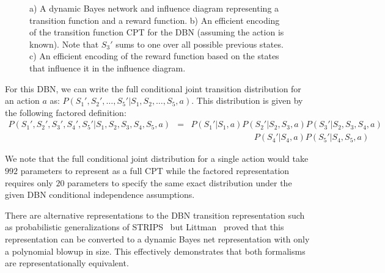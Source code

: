 \begin{figure}[t!]

\begin{center}
\end{center}
\caption{a) A dynamic Bayes network and influence diagram representing
a transition function and a reward function. b) An efficient encoding of
the transition function CPT for the DBN (assuming the action is known). Note that $S_3'$
sums to one over all possible previous states.  c) An efficient encoding
of the reward function based on the states that influence it in the influence
diagram.}
\label{dbnadd}

\end{figure}

For this DBN, we can write the full conditional joint transition distribution for an action $a$ as:
\mbox{$P(S_1',S_2',\ldots,S_5' | S_1,S_2,\ldots,S_5,a)$}.  
This distribution is given by the following factored definition:
\begin{eqnarray}
P(S_1',S_2',S_3',S_4',S_5' | S_1,S_2,S_3,S_4,S_5,a) & = & P(S_1'|S_1,a) P(S_2'|S_2,S_3,a) P(S_3'|S_2,S_3,S_4,a) \nonumber \\
& & \qquad \qquad \qquad \; \; \; \; \; P(S_4'|S_4,a) P(S_5'|S_4,S_5,a) \nonumber
\end{eqnarray}


We note that the full conditional joint distribution for a single action
would take $992$ parameters to
represent as a full CPT while the factored representation requires only $20$
parameters to specify the same exact distribution under the given 
DBN conditional independence assumptions.

There are alternative representations to the DBN transition
representation such as probabilistic
generalizations of STRIPS~\cite{bout-dean-hanks} but 
Littman~\cite{littman:aaai97} proved that this 
representation can be converted to a dynamic
Bayes net representation with only a polynomial
blowup in size.  This effectively demonstrates that both formalisms
are representationally equivalent. 

